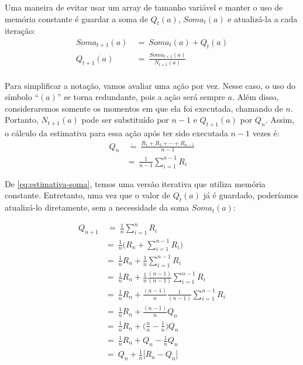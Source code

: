 \documentclass{article}
\begin{document}
        Uma maneira de evitar usar um array de tamanho variável e manter o uso de memória constante é guardar a soma de $Q_t(a)$, $Soma_t(a)$ e atualizá-la a cada iteração:
        \begin{equation}
        \label{eq:estimativa-soma}
        \begin{split}
            Soma_{t+1}(a) & \ = \ Soma_t(a) + Q_t(a) \\
            Q_{t+1}(a) & \ = \ \frac{Soma_{t+1}(a)}{N_{t+1}(a)}  \\
        \end{split}
        \end{equation}

        Para simplificar a notação, vamos avaliar uma ação por vez. Nesse caso, o uso do símbolo ``$(a)$'' se torna redundante, pois a ação será sempre $a$. Além disso, consideraremos somente os momentos em que ela foi executada, chamando de $n$. Portanto, $N_{t+1}(a)$ pode ser substituído por $n-1$ e $Q_{t+1}(a)$ por $Q_n$. Assim, o cálculo da estimativa para essa ação após ter sido executada $n-1$ vezes é:
        \begin{equation}
        \begin{split}
            Q_n & \ \dot{=} \ \frac{R_1 + R_2 + \cdots + R_{n-1}}{n - 1}\\
            & = \ \frac{1}{n-1} \sum_{i=1}^{n-1} R_i
        \end{split}
        \end{equation}
        
        De \eqref{eq:estimativa-soma}, temos uma versão iterativa que utiliza memória constante. Entretanto, uma vez que o valor de $Q_t(a)$ já é guardado, poderíamos atualizá-lo diretamente, sem a necessidade da soma $Soma_t(a)$:
        
        \begin{subequations}
        \begin{align}
            Q_{n+1} & \ \dot{=} \ \frac{1}{n} \sum_{i=1}^{n} R_i\\
            & = \ \frac{1}{n} \Bigg( R_n + \sum_{i=1}^{n-1} R_i \Bigg) \nonumber\\
            & = \ \frac{1}{n} R_n + \frac{1}{n} \sum_{i=1}^{n-1} R_i \nonumber\\
            & = \ \frac{1}{n} R_n + \frac{1}{n} \frac{(n-1)}{(n-1)} \sum_{i=1}^{n-1} R_i \nonumber\\
            & = \ \frac{1}{n} R_n + \frac{(n-1)}{n} \frac{1}{(n-1)} \sum_{i=1}^{n-1} R_i \nonumber\\
            & = \ \frac{1}{n} R_n + \frac{(n-1)}{n} Q_n \nonumber\\
            & = \ \frac{1}{n} R_n + \Bigg( \frac{n}{n} - \frac{1}{n} \Bigg) Q_n \nonumber\\
            & = \ \frac{1}{n} R_n + Q_n - \frac{1}{n} Q_n \nonumber\\
            \label{eq:estimativa-qn}
            & = \ Q_n + \frac{1}{n} \Big[ R_n - Q_n \Big]
        \end{align}
        \end{subequations}
        
\end{document}
